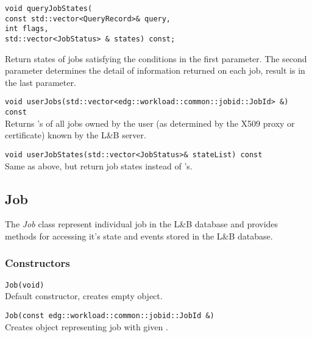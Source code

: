 \documentclass{egee}
\def\LB{L\&B\xspace}
\begin{document}
\begin{description}
\item{
\begin{verbatim}
void queryJobStates(
const std::vector<QueryRecord>& query, 
int flags,
std::vector<JobStatus> & states) const;
\end{verbatim}
}
Return states of jobs satisfying the conditions in the first
parameter. The second parameter determines the detail of information
returned on each job, result is in the last parameter.

\item{\verb|void userJobs(std::vector<edg::workload::common::jobid::JobId> &) const|}\\
Returns \jobid's of all jobs owned by the user (as determined by the
X509 proxy or certificate) known by the \LB server.

\item{\verb|void userJobStates(std::vector<JobStatus>& stateList) const|}\\
Same as above, but return job states instead of \jobid's.

\end{description}

\subsection*{Job}
The \emph{Job} class represent individual job in the \LB database and
provides methods for accessing it's state and events stored in the \LB
database.

\subsubsection*{Constructors}
\begin{description}
\item{\verb|Job(void)|}\\
Default constructor, creates empty object.

\item{\verb|Job(const edg::workload::common::jobid::JobId &)|}\\
Creates object representing job with given \jobid.
\end{description}
\end{document}
